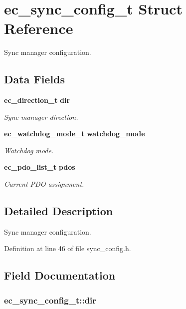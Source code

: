 \section{ec\-\_\-sync\-\_\-config\-\_\-t Struct Reference}
\label{structec__sync__config__t}


Sync manager configuration.  


\subsection*{Data Fields}
\begin{DoxyCompactItemize}
\item 
{\bf ec\-\_\-direction\-\_\-t} {\bf dir}
\begin{DoxyCompactList}\small\item\em Sync manager direction. \end{DoxyCompactList}\item 
{\bf ec\-\_\-watchdog\-\_\-mode\-\_\-t} {\bf watchdog\-\_\-mode}
\begin{DoxyCompactList}\small\item\em Watchdog mode. \end{DoxyCompactList}\item 
{\bf ec\-\_\-pdo\-\_\-list\-\_\-t} {\bf pdos}
\begin{DoxyCompactList}\small\item\em Current P\-D\-O assignment. \end{DoxyCompactList}\end{DoxyCompactItemize}


\subsection{Detailed Description}
Sync manager configuration. 

Definition at line 46 of file sync\-\_\-config.\-h.



\subsection{Field Documentation}
\subsubsection[{dir}]{ ec\-\_\-sync\-\_\-config\-\_\-t\-::dir}\label{structec__sync__config__t_a24246e2777a46c8aa69dcfbe6a32e4c7}


